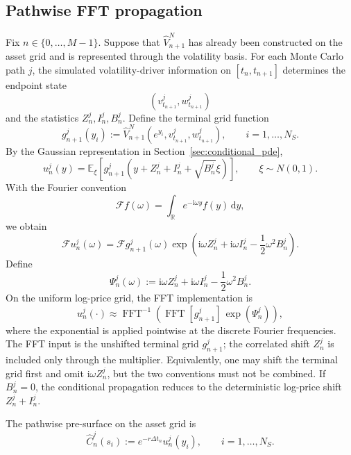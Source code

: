 \documentclass[pdflatex,sn-mathphys-num]{sn-jnl}
\theoremstyle{thmstyleone}%
\theoremstyle{thmstylethree}%
\theoremstyle{thmstyletwo}%
\newcommand{\dd}{\mathrm d}
\newcommand{\E}{\mathbb E}
\newcommand{\R}{\mathbb R}
\begin{document}
\subsection{Pathwise FFT propagation}
Fix $n\in\{0,\ldots,M-1\}$. Suppose that $\widehat V_{n+1}^N$ has already been
constructed on the asset grid and is represented through the volatility basis.
For each Monte Carlo path $j$, the simulated volatility-driver information on
$[t_n,t_{n+1}]$ determines the endpoint state
\[
    (v_{t_{n+1}}^j,w_{t_{n+1}}^j)
\]
and the statistics $Z_n^j,I_n^j,B_n^j$. Define the terminal grid function
\[
    g_{n+1}^j(y_i)
    :=
    \widehat V_{n+1}^N
    \left(e^{y_i},v_{t_{n+1}}^j,w_{t_{n+1}}^j\right),
    \qquad i=1,\ldots,N_S.
\]
By the Gaussian representation in Section~\ref{sec:conditional_pde},
\[
    u_n^j(y)
    =
    \E_\xi\!\left[
        g_{n+1}^j
        \left(
            y+Z_n^j+I_n^j+\sqrt{B_n^j}\xi
        \right)
    \right],
    \qquad \xi\sim N(0,1).
\]
With the Fourier convention
\[
    \mathcal F f(\omega)
    =
    \int_{\R}e^{-\mathrm i\omega y}f(y)\,\dd y,
\]
we obtain
\[
    \mathcal F u_n^j(\omega)
    =
    \mathcal F g_{n+1}^j(\omega)
    \exp\left(
        \mathrm i\omega Z_n^j+\mathrm i\omega I_n^j-\frac12\omega^2B_n^j
    \right).
\]
Define
\[
    \Psi_n^j(\omega)
    :=
    \mathrm i\omega Z_n^j+\mathrm i\omega I_n^j-\frac12\omega^2B_n^j.
\]
On the uniform log-price grid, the FFT implementation is
\begin{equation}
    u_n^j(\cdot)
    \approx
    \operatorname{FFT}^{-1}
    \left(
        \operatorname{FFT}[g_{n+1}^j]\,
        \exp(\Psi_n^j)
    \right),
\label{eq:fft-recursion}
\end{equation}
where the exponential is applied pointwise at the discrete Fourier frequencies.
The FFT input is the unshifted terminal grid $g_{n+1}^j$; the correlated shift
$Z_n^j$ is included only through the multiplier. Equivalently, one may shift the
terminal grid first and omit $\mathrm i\omega Z_n^j$, but the two conventions
must not be combined. If $B_n^j=0$, the conditional propagation reduces to the
deterministic log-price shift $Z_n^j+I_n^j$.

The pathwise pre-surface on the asset grid is
\[
    \widehat C_n^j(s_i)
    :=
    e^{-r\Delta t_n}u_n^j(y_i),
    \qquad i=1,\ldots,N_S.
\]
\end{document}
